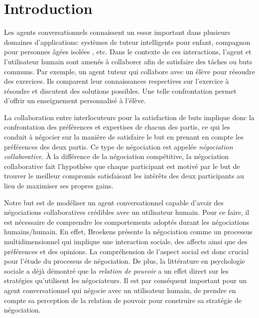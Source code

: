 \documentclass [french]{sig-alternate-05-2015}
\begin{document}
	\section{Introduction}
	Les agents conversationnels connaissent un essor important  dans plusieurs domaines d'applications: systèmes de tuteur intelligents \cite{graesser2001intelligent} pour enfant, compagnon pour personnes âgées isolées \cite{bickmore2005s}, etc.
	Dans le contexte de ces interactions, l'agent et l'utilisateur humain  sont amenés à collaborer afin de satisfaire des tâches ou buts communs. Par exemple, un agent tuteur qui collabore avec un élève pour résoudre des exercices. Ils comparent leur connaissances respectives sur l'exercice à résoudre et discutent des solutions possibles. Une telle confrontation  permet d'offrir un enseignement personnalisé à l'élève. 
	
	La collaboration entre interlocuteurs pour la satisfaction de buts implique donc la confrontation des préférences et expertises de chacun des partis, ce qui les conduit à négocier sur la manière de satisfaire le but en prenant en compte les préférences des deux partis. Ce type de négociation est appelée \emph{négociation collaborative.} À la différence de la négociation compétitive, la négociation collaborative fait l'hypothèse que chaque participant est motivé par le but de trouver le meilleur compromis satisfaisant les intérêts des deux participants au lieu de maximiser ses propres gains.
	
	Notre but est de modéliser un agent conversationnel capable d'avoir des négociations collaboratives crédibles avec un utilisateur humain.
	Pour ce faire, il est nécessaire de comprendre les comportements adoptés durant les négociations humains/humain. En effet,  Broekens \cite{broekens2010affective} présente la négociation comme un processus multidimensionnel qui implique une interaction sociale, des affects ainsi que des préférences et des opinions. La compréhension de l'aspect social est donc crucial pour l'étude du processus de négociation.
	De plus, la littérature en psychologie sociale a déjà démontré que la \emph{relation de pouvoir} a un effet direct sur les stratégies qu'utilisent les négociateurs.
	Il est par conséquent important pour un agent conversationnel qui négocie avec un utilisateur humain, de prendre en compte sa perception de la relation de pouvoir pour construire sa stratégie de négociation.
	
\end{document}
